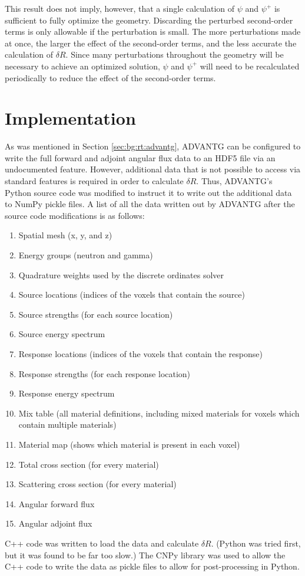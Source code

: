 This result does not imply, however, that a single calculation of $\psi$ and $\psi^+$ is sufficient to fully optimize the geometry.
Discarding the perturbed second-order terms is only allowable if the perturbation is small.
The more perturbations made at once, the larger the effect of the second-order terms, and the less accurate the calculation of $\delta R$.
Since many perturbations throughout the geometry will be necessary to achieve an optimized solution, $\psi$ and $\psi^+$ will need to be recalculated periodically to reduce the effect of the second-order terms.

\section{Implementation}
\label{sec:dr:implementation}

As was mentioned in Section \ref{sec:bg:rt:advantg}, ADVANTG can be configured to write the full forward and adjoint angular flux data to an HDF5 file via an undocumented feature.
However, additional data that is not possible to access via standard features is required in order to calculate $\delta R$.
Thus, ADVANTG's Python source code was modified to instruct it to write out the additional data to NumPy \cite{numpy} pickle files.
A list of all the data written out by ADVANTG after the source code modifications is as follows:

\begin{enumerate}
  \item Spatial mesh (x, y, and z)
  \item Energy groups (neutron and gamma)
  \item Quadrature weights used by the discrete ordinates solver
  \item Source locations (indices of the voxels that contain the source)
  \item Source strengths (for each source location)
  \item Source energy spectrum
  \item Response locations (indices of the voxels that contain the response)
  \item Response strengths (for each response location)
  \item Response energy spectrum
  \item Mix table (all material definitions, including mixed materials for voxels which contain multiple materials)
  \item Material map (shows which material is present in each voxel)
  \item Total cross section (for every material)
  \item Scattering cross section (for every material)
  \item Angular forward flux
  \item Angular adjoint flux
\end{enumerate}

C++ code was written to load the data and calculate $\delta R$.
(Python was tried first, but it was found to be far too slow.)
The CNPy \cite{cnpy} library was used to allow the C++ code to write the data as pickle files to allow for post-processing in Python.
